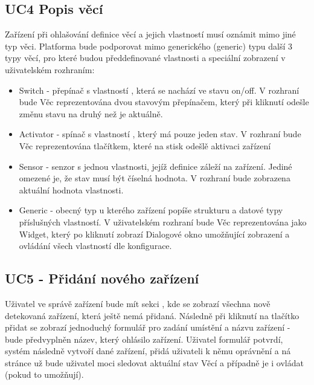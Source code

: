 \subsection{UC4 Popis věcí}
Zařízení při ohlašování definice věcí a jejich vlastností musí oznámit mimo jiné typ věci. Platforma bude podporovat mimo generického (generic) typu další 3 typy věcí, pro které budou předdefinované vlastnosti a speciální zobrazení v uživatelském rozhraním:
\begin{itemize}
    \item Switch - přepínač s vlastností , která se nachází ve stavu on/off. V rozhraní bude Věc reprezentována dvou stavovým přepínačem, který při kliknutí odešle změnu stavu na druhý než je aktuálně.
    \item Activator - spínač s vlastností , který má pouze jeden stav. V rozhraní bude Věc reprezentována tlačítkem, které na stisk odešlě aktivaci zařízení
    \item Sensor - senzor s jednou vlastnosti, jejíž definice záleží na zařízení. Jediné omezené je, že stav musí být číselná hodnota. V rozhraní bude zobrazena aktuální hodnota vlastnosti.
    \item Generic - obecný typ u kterého zařízení popíše strukturu a datové typy příslušných vlastností. V uživatelském rozhraní bude Věc reprezentována jako Widget, který po kliknutí zobrazí Dialogové okno umožňující zobrazení a ovládání všech vlastností dle konfigurace.
\end{itemize}


\subsection{UC5 - Přidání nového zařízení}
Uživatel ve správě zařízení bude mít sekci , kde se zobrazí všechna nově detekovaná zařízení, která ještě nemá přidaná. Následně při kliknutí na tlačítko přidat se zobrazí jednoduchý formulář pro zadání umístění a názvu zařízení - bude předvyplněn název, který ohlásilo zařízení. Uživatel formulář potvrdí, systém následně vytvoří dané zařízení, přidá uživateli k němu oprávnění a ná stránce  už bude uživatel moci sledovat aktuální stav Věcí a případně je i ovládat (pokud to umožňují).



